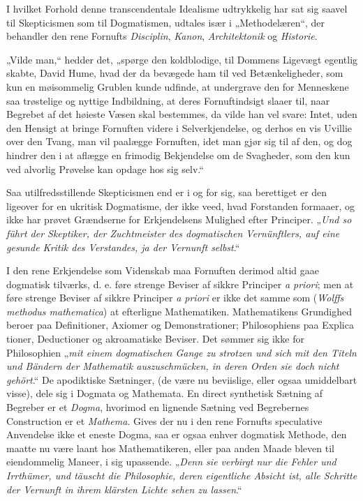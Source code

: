 \documentclass[12pt]{book}
\newcommand{\opage}[1]{\marginnote{\footnotesize\textit{[#1]}}}
\begin{document}
I hvilket Forhold denne transcendentale Idealisme udtrykkelig har sat sig saavel til
Skepticismen som til Dogmatismen, udtales især i „Methodelæren“, der behandler den
rene Fornufts \emph{Disciplin}, \emph{Kanon}, \emph{Architektonik} og
\emph{Historie}.

„Vilde man,“ hedder det, „spørge den koldblodige, til Dommens Ligevægt egentlig
skabte, David Hume, hvad der da bevægede ham til ved Betænkeligheder, som kun en
møisommelig Grublen kunde udfinde, at undergrave den for Menneskene saa trøstelige
og nyttige Indbildning, at deres Fornuftindsigt slaaer til, naar Begrebet af det
høieste Væsen skal bestemmes, da vilde han vel svare: Intet, uden den Hensigt at
bringe Fornuften videre i Selverkjendelse, og derhos en vis Uvillie over den Tvang,
man vil paalægge Fornuften, idet man gjør sig til af den, og dog hindrer den i at
aflægge en frimodig Bekjendelse om de Svagheder, som den kun ved alvorlig Prøvelse
kan opdage hos sig selv.“

Saa utilfredsstillende Skepticismen end er i og for sig, saa berettiget er den
ligeover for en ukritisk Dogmatisme, der ikke veed, hvad Forstanden formaaer, og
ikke har prøvet Grændserne for Erkjendelsens Mulighed efter Principer. „\textit{Und
so führt der Skeptiker, der Zuchtmeister des dogmatischen Vernünftlers, auf eine
gesunde Kritik des Verstandes, ja der Vernunft selbst}.“

I den rene Erkjendelse som Videnskab maa Fornuften derimod altid gaae dogmatisk
tilværks, d. e. føre strenge Beviser af sikkre Principer \textit{a priori}; men at
føre strenge Beviser af sikkre Principer \textit{a priori} er ikke det samme som
(\textit{Wolffs methodus mathematica}) at efterligne Mathematiken. Mathematikens
Grundighed beroer paa Definitioner, Axiomer og Demonstrationer; Philosophiens paa
Explica%
\opage{33}tioner, Deductioner og akroamatiske Beviser. Det sømmer sig ikke for Philosophien
„\textit{mit einem dogmatischen Gange zu strotzen und sich mit den Titeln und
Bändern der Mathematik auszuschmücken, in deren Orden sie doch nicht gehört}.“ De
apodiktiske Sætninger, (de være nu beviislige, eller ogsaa umiddelbart visse), dele
sig i Dogmata og Mathemata. En direct synthetisk Sætning af Begreber er et
\emph{Dogma}, hvorimod en lignende Sætning ved Begrebernes Construction er et
\emph{Mathema}. Gives der nu i den rene Fornufts speculative Anvendelse ikke et
eneste Dogma, saa er ogsaa enhver dogmatisk Methode, den maatte nu være laant hos
Mathematikeren, eller paa anden Maade bleven til eiendommelig Maneer, i sig
upassende. „\textit{Denn sie verbirgt nur die Fehler und Irrthümer, und täuscht die
Philosophie, deren eigentliche Absicht ist, alle Schritte der Vernunft in ihrem
klärsten Lichte sehen zu lassen}.“
\end{document}
